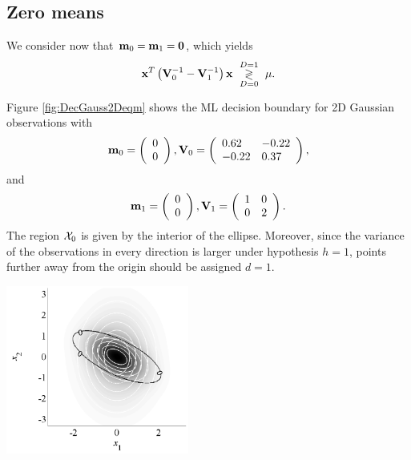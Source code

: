 \subsection{Zero means}

We consider now that ${\bf m}_0 = {\bf m}_1 = \mathbf{0}$, which yields
\begin{equation*}
{\bf x}^T \left({\bf V}_0^{-1}-{\bf V}_1^{-1}\right){\bf x} \,\, \underset{D=0}{\overset{D=1}{\gtrless}}\,\, \mu.
\label{eq:logLRTGauss2m0}
\end{equation*}

\begin{example}
	Figure \ref{fig:DecGauss2Deqm} shows the ML decision boundary for 2D Gaussian observations with
		\begin{equation*}
{\bf m}_0 =  \left(\begin{array}{l}  0\\0   \end{array}\right), {\bf V}_0 = 
\left(\begin{array}{ll} 0.62 & -0.22 \\ -0.22 & 0.37 \end{array} \right),
\end{equation*}
and
\begin{equation*}
{\bf m}_1 = \left(\begin{array}{l}  0\\0  \end{array}\right), {\bf V}_1 = 
\left(\begin{array}{ll} 1 & 0 \\ 0 & 2 \end{array} \right).
\end{equation*}
	The region ${\cal X}_0$ is given by the interior of the ellipse. Moreover, since the variance of the observations in every direction is larger under hypothesis $h=1$, points further away from the origin should be assigned $d=1$.
		\begin{center}
			\includegraphics[width=6cm]{Figures/DecGauss2Deqm.pdf}
			\label{fig:DecGauss2Deqm}
		\end{center}
\end{example}


